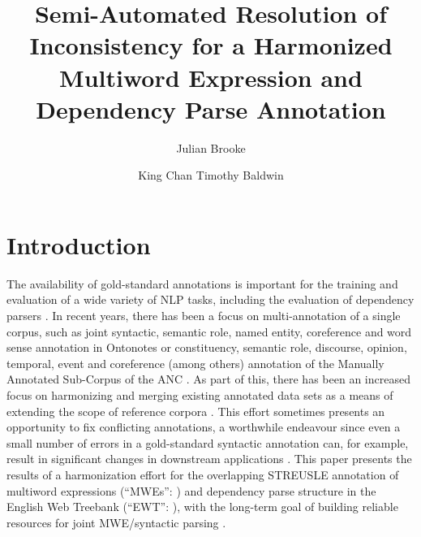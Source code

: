 \documentclass[output=paper
,modfonts
,nonflat]{langsci/langscibook}
\title{Semi-Automated Resolution of Inconsistency for a Harmonized Multiword Expression and Dependency Parse Annotation}
\author{%
 Julian Brooke\affiliation{The University of Melbourne}\and 
 King Chan\affiliation{The University of Melbourne}\lastand 
 Timothy Baldwin \affiliation{The University of Melbourne}
}
\begin{document}
\maketitle

\section{Introduction}

The availability of gold-standard annotations is important for the training and evaluation of a wide variety of NLP tasks, including the evaluation of dependency parsers \citep{Buchholz:2006:CST:1596276.1596305}. In recent years, there has been a focus on multi-annotation of a single corpus, such as joint syntactic, semantic role, named entity, coreference and word sense annotation in Ontonotes \citep{Hovy+:2006} or constituency, semantic role, discourse, opinion, temporal, event and coreference (among others) annotation of the Manually Annotated Sub-Corpus of the ANC \citep{Ide+:2010}. As part of this, there has been an increased focus on harmonizing and merging existing annotated data sets as a means of extending the scope of reference corpora \citep{Ide:2007:GGF:1642059.1642060,Declerk08,SimiMB15}.  This effort sometimes presents an opportunity to fix conflicting annotations, a worthwhile endeavour since even a small number of errors in a gold-standard syntactic annotation can, for example, result in significant changes in downstream applications \citep{habash2007determining}. This paper presents the results of a harmonization effort for the overlapping STREUSLE annotation \citep{Schneider14} of multiword expressions (``MWEs'': \citet{Baldwin10}) and dependency parse structure in the English Web Treebank (``EWT'': \citet{EWT}), with the long-term goal of building reliable resources for joint MWE/syntactic parsing \citep{Constant16}.
\end{document}
